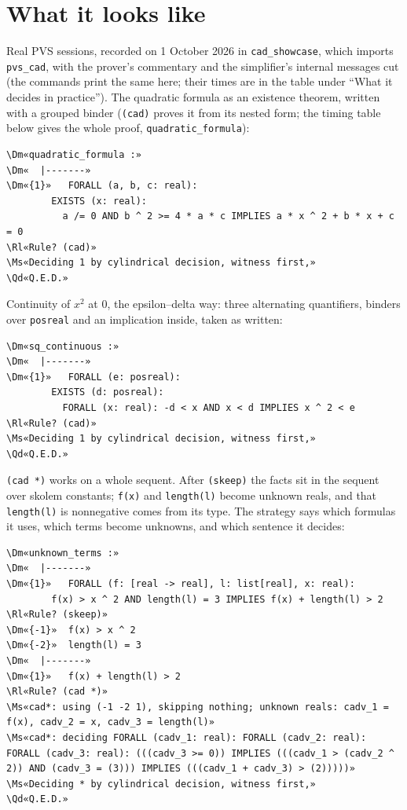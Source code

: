 \documentclass[11pt]{article}
\newcommand\Rl[1]{\textcolor{accent}{\textbf{#1}}}
\newcommand\Ms[1]{\textcolor{moss}{\textbf{#1}}}
\newcommand\Dm[1]{\textcolor{muted}{#1}}
\newcommand\Qd[1]{\colorbox{mosssoft}{\textcolor{moss}{\textbf{#1}}}}
\begin{document}
\section{What it looks like}
Real PVS sessions, recorded on 1 October 2026 in \texttt{cad\_showcase}, which imports \texttt{pvs\_cad}, with the
prover's commentary and the simplifier's internal messages cut (the commands print the same here; their times are
in the table under ``What it decides in practice''). The quadratic formula as an existence theorem, written
with a grouped binder (\texttt{(cad)} proves it from its nested form; the timing table below gives the whole proof,
\texttt{quadratic\_formula}):
\begin{termbox}
\begin{Verbatim}[commandchars=\\«», fontsize=\footnotesize]
\Dm«quadratic_formula :»
\Dm«  |-------»
\Dm«{1}»   FORALL (a, b, c: real):
        EXISTS (x: real):
          a /= 0 AND b ^ 2 >= 4 * a * c IMPLIES a * x ^ 2 + b * x + c = 0
\Rl«Rule? (cad)»
\Ms«Deciding 1 by cylindrical decision, witness first,»
\Qd«Q.E.D.»
\end{Verbatim}
\end{termbox}

Continuity of $x^2$ at 0, the epsilon--delta way: three alternating quantifiers, binders over \texttt{posreal} and an
implication inside, taken as written:
\begin{termbox}
\begin{Verbatim}[commandchars=\\«», fontsize=\footnotesize]
\Dm«sq_continuous :»
\Dm«  |-------»
\Dm«{1}»   FORALL (e: posreal):
        EXISTS (d: posreal):
          FORALL (x: real): -d < x AND x < d IMPLIES x ^ 2 < e
\Rl«Rule? (cad)»
\Ms«Deciding 1 by cylindrical decision, witness first,»
\Qd«Q.E.D.»
\end{Verbatim}
\end{termbox}

\texttt{(cad *)} works on a whole sequent. After \texttt{(skeep)} the facts sit in the sequent over skolem constants;
\texttt{f(x)} and \texttt{length(l)} become unknown reals, and that \texttt{length(l)} is nonnegative comes from its
type. The strategy says which formulas it uses, which terms become unknowns, and which sentence it decides:
\begin{termbox}
\begin{Verbatim}[commandchars=\\«», fontsize=\footnotesize]
\Dm«unknown_terms :»
\Dm«  |-------»
\Dm«{1}»   FORALL (f: [real -> real], l: list[real], x: real):
        f(x) > x ^ 2 AND length(l) = 3 IMPLIES f(x) + length(l) > 2
\Rl«Rule? (skeep)»
\Dm«{-1}»  f(x) > x ^ 2
\Dm«{-2}»  length(l) = 3
\Dm«  |-------»
\Dm«{1}»   f(x) + length(l) > 2
\Rl«Rule? (cad *)»
\Ms«cad*: using (-1 -2 1), skipping nothing; unknown reals: cadv_1 = f(x), cadv_2 = x, cadv_3 = length(l)»
\Ms«cad*: deciding FORALL (cadv_1: real): FORALL (cadv_2: real): FORALL (cadv_3: real): (((cadv_3 >= 0)) IMPLIES (((cadv_1 > (cadv_2 ^ 2)) AND (cadv_3 = (3))) IMPLIES (((cadv_1 + cadv_3) > (2)))))»
\Ms«Deciding * by cylindrical decision, witness first,»
\Qd«Q.E.D.»
\end{Verbatim}
\end{termbox}
\end{document}
